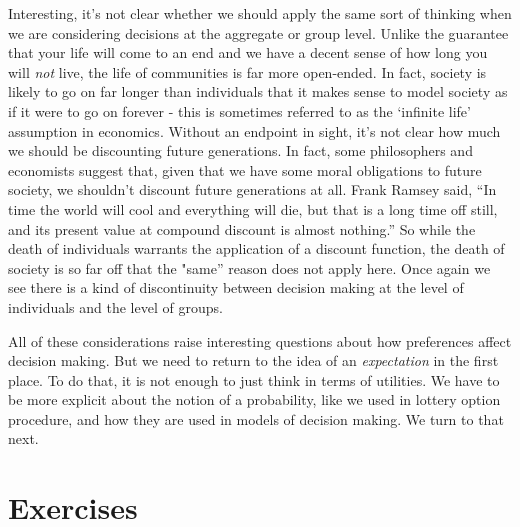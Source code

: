 \documentclass[]{tufte-book}
\begin{document}
Interesting, it's not clear whether we should apply the same sort of thinking when we are considering decisions at the aggregate or group level. Unlike the guarantee that your life will come to an end and we have a decent sense of how long you will \emph{not} live, the life of communities is far more open-ended. In fact, society is likely to go on far longer than individuals that it makes sense to model society as if it were to go on forever - this is sometimes referred to as the `infinite life' assumption in economics. Without an endpoint in sight, it's not clear how much we should be discounting future generations. In fact, some philosophers and economists suggest that, given that we have some moral obligations to future society, we shouldn't discount future generations at all. Frank Ramsey said, ``In time the world will cool and everything will die, but that is a long time off still, and its present value at compound discount is almost nothing.'' So while the death of individuals warrants the application of a discount function, the death of society is so far off that the "same'' reason does not apply here. Once again we see there is a kind of discontinuity between decision making at the level of individuals and the level of groups.

All of these considerations raise interesting questions about how preferences affect decision making. But we need to return to the idea of an \emph{expectation} in the first place. To do that, it is not enough to just think in terms of utilities. We have to be more explicit about the notion of a probability, like we used in lottery option procedure, and how they are used in models of decision making. We turn to that next.

\hypertarget{exercises-3}{%
\section*{Exercises}\label{exercises-3}}
\end{document}
